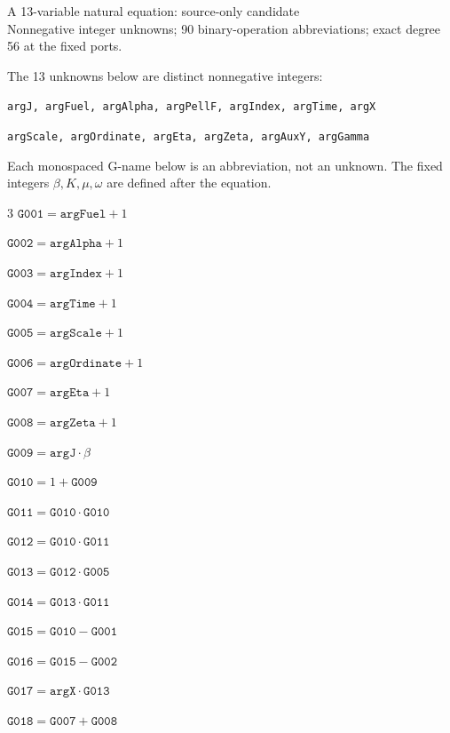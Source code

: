 \documentclass[10pt]{article}
\begin{document}
\begin{center}{\Large A 13-variable natural equation: source-only candidate}\\
Nonnegative integer unknowns; 90 binary-operation abbreviations; exact degree 56 at the fixed ports.
\end{center}
The 13 unknowns below are distinct nonnegative integers:
\par\small
\noindent\texttt{argJ, argFuel, argAlpha, argPellF, argIndex, argTime, argX}\par
\noindent\texttt{argScale, argOrdinate, argEta, argZeta, argAuxY, argGamma}\par
\normalsize
Each monospaced G-name below is an abbreviation, not an unknown. The fixed integers $\beta,K,\mu,\omega$ are defined after the equation.
\begin{multicols}{3}\small
\noindent $\mathtt{G001}=\mathtt{argFuel}+1$\par
\noindent $\mathtt{G002}=\mathtt{argAlpha}+1$\par
\noindent $\mathtt{G003}=\mathtt{argIndex}+1$\par
\noindent $\mathtt{G004}=\mathtt{argTime}+1$\par
\noindent $\mathtt{G005}=\mathtt{argScale}+1$\par
\noindent $\mathtt{G006}=\mathtt{argOrdinate}+1$\par
\noindent $\mathtt{G007}=\mathtt{argEta}+1$\par
\noindent $\mathtt{G008}=\mathtt{argZeta}+1$\par
\noindent $\mathtt{G009}=\mathtt{argJ}\cdot \beta$\par
\noindent $\mathtt{G010}=1+\mathtt{G009}$\par
\noindent $\mathtt{G011}=\mathtt{G010}\cdot \mathtt{G010}$\par
\noindent $\mathtt{G012}=\mathtt{G010}\cdot \mathtt{G011}$\par
\noindent $\mathtt{G013}=\mathtt{G012}\cdot \mathtt{G005}$\par
\noindent $\mathtt{G014}=\mathtt{G013}\cdot \mathtt{G011}$\par
\noindent $\mathtt{G015}=\mathtt{G010}-\mathtt{G001}$\par
\noindent $\mathtt{G016}=\mathtt{G015}-\mathtt{G002}$\par
\noindent $\mathtt{G017}=\mathtt{argX}\cdot \mathtt{G013}$\par
\noindent $\mathtt{G018}=\mathtt{G007}+\mathtt{G008}$\par

\end{multicols}
\end{document}
